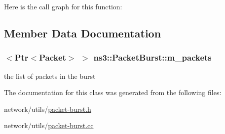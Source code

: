 Here is the call graph for this function\+:




\subsection{Member Data Documentation}
\subsubsection[{\texorpdfstring{m\+\_\+packets}{m_packets}}]{$<${\bf Ptr}$<${\bf Packet}$>$ $>$ ns3\+::\+Packet\+Burst\+::m\+\_\+packets\hspace{0.3cm}{\ttfamily [private]}}\hypertarget{classns3_1_1PacketBurst_a3c2aeb2fb721d9da2d855eab1baed309}{}\label{classns3_1_1PacketBurst_a3c2aeb2fb721d9da2d855eab1baed309}


the list of packets in the burst 



The documentation for this class was generated from the following files\+:\begin{DoxyCompactItemize}
\item 
network/utils/\hyperlink{packet-burst_8h}{packet-\/burst.\+h}\item 
network/utils/\hyperlink{packet-burst_8cc}{packet-\/burst.\+cc}\end{DoxyCompactItemize}
